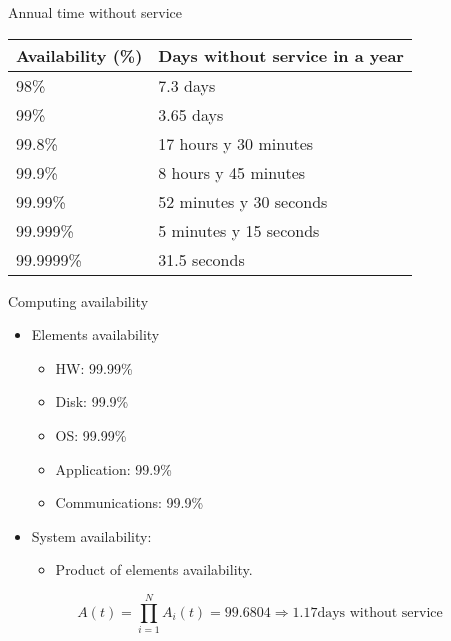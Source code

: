 \begin{frame}{Annual time without service}
\begin{center}
{\small
\begin{tabular}{|l|l|}
\hline
Availability (\%) & Days without service in a year\\
\hline
\hline
98\% & 7.3 days\\
\hline
99\% & 3.65 days\\
\hline
99.8\% & 17 hours y 30 minutes\\
\hline
99.9\% & 8 hours y 45 minutes\\
\hline
99.99\% & 52 minutes y 30 seconds\\
\hline
99.999\% & 5 minutes y 15 seconds\\
\hline
99.9999\% & 31.5 seconds\\
\hline
\end{tabular}
}
\end{center}
\end{frame}

\begin{frame}{Computing availability}
\begin{itemize}
  \item Elements availability
    \begin{itemize}
      \item HW: 99.99\%
      \item Disk: 99.9\%
      \item OS: 99.99\%
      \item Application: 99.9\%
      \item Communications: 99.9\%
    \end{itemize}

  \item System availability:
    \begin{itemize}
      \item Product of elements availability.
    \end{itemize}
\end{itemize}
\begin{equation*}
A(t) = \prod_{i=1}^{N} A_i(t) = 99.6804 \Rightarrow 1.17 \text{days without service}
\end{equation*}
\end{frame}

